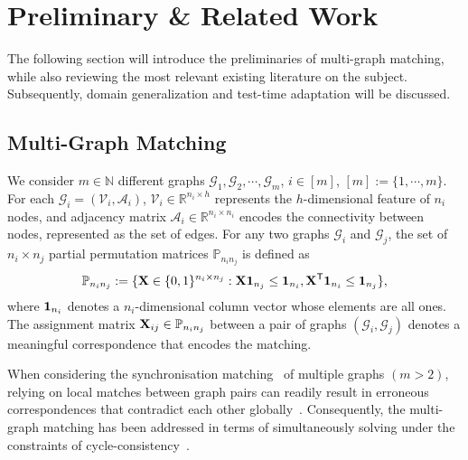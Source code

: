 \section{Preliminary \& Related Work}

The following section will introduce the preliminaries of multi-graph matching, while also reviewing the most relevant existing literature on the subject. Subsequently, domain generalization and test-time adaptation will be discussed.
\subsection{Multi-Graph Matching}
We consider $m \in \mathbb{N}$ different graphs $\mathcal{G}_1, \mathcal{G}_2, \cdots, \mathcal{G}_m$, $i \in [m]$, $[m] := \{1,\cdots,m\}$. For each $\mathcal{G}_i=(\mathcal{V}_i, \mathcal{A}_i)$, $\mathcal{V}_i\in \mathbb{R}^{n_i \times h}$ represents the $h$-dimensional feature of $n_i$ nodes, and adjacency matrix $\mathcal{A}_i\in \mathbb{R}^{n_i \times n_i}$ encodes the connectivity between nodes, represented as the set of edges. For any two graphs $\mathcal{G}_i$ and $\mathcal{G}_j$, the set of $n_i \times n_j$ partial permutation matrices $\mathbb{P}_{n_i n_j}$ is defined as 
\begin{equation}
    \mathbb{P}_{n_i n_j} := \{\bold{X}\in \{0,1\}^{n_i\times n_j}: \bold{X}\bold{1}_{n_j} \leq \bold{1}_{n_i}, \bold{X}^{\mathsf{T}}\bold{1}_{n_i} \leq \bold{1}_{n_j}\},
\end{equation}
where $\bold{1}_{n_i}$ denotes a $n_i$-dimensional column vector whose elements are all ones. The assignment matrix $\bold{X}_{ij} \in \mathbb{P}_{n_i n_j}$ between a pair of graphs $(\mathcal{G}_i, \mathcal{G}_j )$ denotes a meaningful correspondence that encodes the matching. 

When considering the synchronisation matching~\cite{pachauri2013solving,maset2017practical} of multiple graphs $(m>2)$, relying on local matches between graph pairs can readily result in erroneous correspondences that contradict each other globally~\cite{yan2013joint}. Consequently, the multi-graph matching has been addressed in terms of simultaneously solving under the constraints of cycle-consistency~\cite{yan2015multi,yan2014graduated}.


